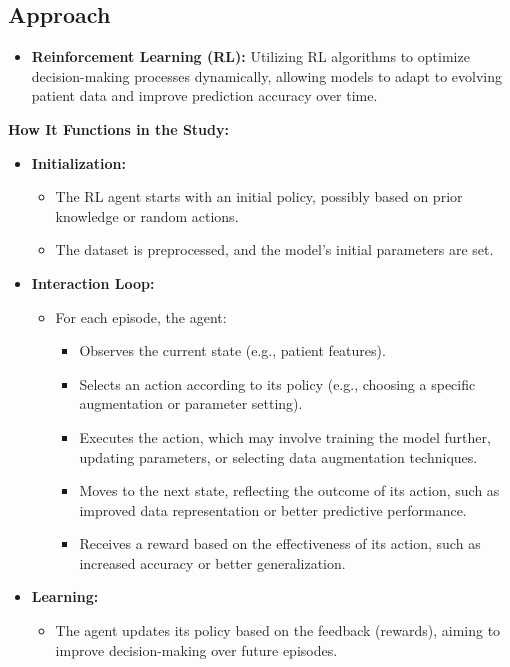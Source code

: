 \subsection*{Approach}
\begin{itemize}
    \item \textbf{Reinforcement Learning (RL):} Utilizing RL algorithms to optimize decision-making processes dynamically, allowing models to adapt to evolving patient data and improve prediction accuracy over time.
\end{itemize}

\noindent \textbf{How It Functions in the Study:}
\begin{itemize}
    \item \textbf{Initialization:}
        \begin{itemize}
            \item The RL agent starts with an initial policy, possibly based on prior knowledge or random actions.
            \item The dataset is preprocessed, and the model's initial parameters are set.
        \end{itemize}
    \item \textbf{Interaction Loop:}
        \begin{itemize}
            \item For each episode, the agent:
            \begin{itemize}
                \item Observes the current state (e.g., patient features).
                \item Selects an action according to its policy (e.g., choosing a specific augmentation or parameter setting).
                \item Executes the action, which may involve training the model further, updating parameters, or selecting data augmentation techniques.
                \item Moves to the next state, reflecting the outcome of its action, such as improved data representation or better predictive performance.
                \item Receives a reward based on the effectiveness of its action, such as increased accuracy or better generalization.
            \end{itemize}
        \end{itemize}
    \item \textbf{Learning:}
        \begin{itemize}
            \item The agent updates its policy based on the feedback (rewards), aiming to improve decision-making over future episodes.

\end{itemize}
\end{itemize}
